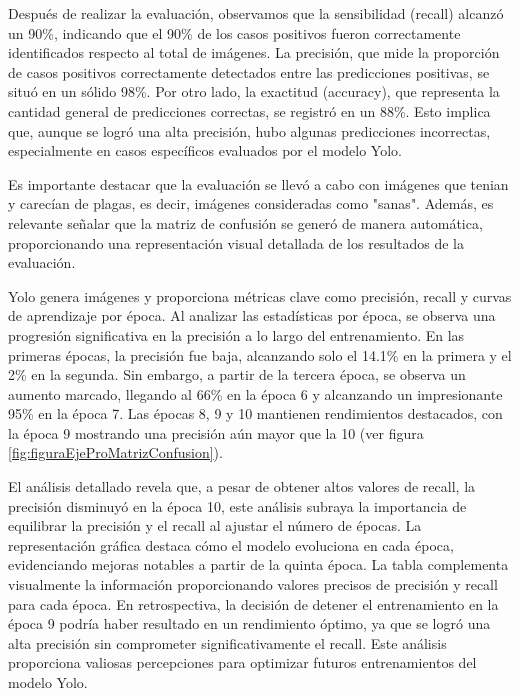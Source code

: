Después de realizar la evaluación, observamos que la sensibilidad (recall) alcanzó un 90\%, indicando que el 90\% de los casos positivos fueron correctamente identificados respecto al total de imágenes. La precisión, que mide la proporción de casos positivos correctamente detectados entre las predicciones positivas, se situó en un sólido 98\%. Por otro lado, la exactitud (accuracy), que representa la cantidad general de predicciones correctas, se registró en un 88\%. Esto implica que, aunque se logró una alta precisión, hubo algunas predicciones incorrectas, especialmente en casos específicos evaluados por el modelo Yolo.


\newpage

Es importante destacar que la evaluación se llevó a cabo con imágenes que tenian y carecían de plagas, es decir, imágenes consideradas como "sanas". Además, es relevante señalar que la matriz de confusión se generó de manera automática, proporcionando una representación visual detallada de los resultados de la evaluación.

Yolo genera imágenes y proporciona métricas clave como precisión, recall y curvas de aprendizaje por época. Al analizar las estadísticas por época, se observa una progresión significativa en la precisión a lo largo del entrenamiento. En las primeras épocas, la precisión fue baja, alcanzando solo el 14.1\% en la primera y el 2\% en la segunda. Sin embargo, a partir de la tercera época, se observa un aumento marcado, llegando al 66\% en la época 6 y alcanzando un impresionante 95\% en la época 7. Las épocas 8, 9 y 10 mantienen rendimientos destacados, con la época 9 mostrando una precisión aún mayor que la 10 (ver figura \ref{fig:figuraEjeProMatrizConfusion}).

El análisis detallado revela que, a pesar de obtener altos valores de recall, la precisión disminuyó en la época 10, este análisis subraya la importancia de equilibrar la precisión y el recall al ajustar el número de épocas. La representación gráfica destaca cómo el modelo evoluciona en cada época, evidenciando mejoras notables a partir de la quinta época. La tabla complementa visualmente la información proporcionando valores precisos de precisión y recall para cada época. En retrospectiva, la decisión de detener el entrenamiento en la época 9 podría haber resultado en un rendimiento óptimo, ya que se logró una alta precisión sin comprometer significativamente el recall. Este análisis proporciona valiosas percepciones para optimizar futuros entrenamientos del modelo Yolo.

